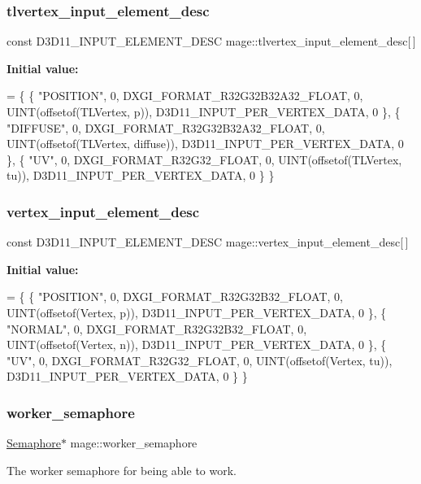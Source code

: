 \subsubsection{\texorpdfstring{tlvertex\+\_\+input\+\_\+element\+\_\+desc}{tlvertex\_input\_element\_desc}}
{\footnotesize\ttfamily const D3\+D11\+\_\+\+I\+N\+P\+U\+T\+\_\+\+E\+L\+E\+M\+E\+N\+T\+\_\+\+D\+E\+SC mage\+::tlvertex\+\_\+input\+\_\+element\+\_\+desc\mbox{[}$\,$\mbox{]}}

{\bfseries Initial value\+:}
\begin{DoxyCode}
= \{
        \{ \textcolor{stringliteral}{"POSITION"}, 0, DXGI\_FORMAT\_R32G32B32A32\_FLOAT, 0, UINT(offsetof(TLVertex, p)), 
      D3D11\_INPUT\_PER\_VERTEX\_DATA, 0 \},
        \{ \textcolor{stringliteral}{"DIFFUSE"}, 0, DXGI\_FORMAT\_R32G32B32A32\_FLOAT, 0, UINT(offsetof(TLVertex, diffuse)), 
      D3D11\_INPUT\_PER\_VERTEX\_DATA, 0 \},
        \{ \textcolor{stringliteral}{"UV"}, 0, DXGI\_FORMAT\_R32G32\_FLOAT, 0, UINT(offsetof(TLVertex, tu)), D3D11\_INPUT\_PER\_VERTEX\_DATA, 
      0 \}
    \}
\end{DoxyCode}
\hypertarget{namespacemage_a8647e0bbbbe87e5c6d7a4d4622230119}{}\label{namespacemage_a8647e0bbbbe87e5c6d7a4d4622230119} 
\subsubsection{\texorpdfstring{vertex\+\_\+input\+\_\+element\+\_\+desc}{vertex\_input\_element\_desc}}
{\footnotesize\ttfamily const D3\+D11\+\_\+\+I\+N\+P\+U\+T\+\_\+\+E\+L\+E\+M\+E\+N\+T\+\_\+\+D\+E\+SC mage\+::vertex\+\_\+input\+\_\+element\+\_\+desc\mbox{[}$\,$\mbox{]}}

{\bfseries Initial value\+:}
\begin{DoxyCode}
= \{
        \{ \textcolor{stringliteral}{"POSITION"}, 0, DXGI\_FORMAT\_R32G32B32\_FLOAT, 0, UINT(offsetof(Vertex, p)), 
      D3D11\_INPUT\_PER\_VERTEX\_DATA, 0 \},
        \{ \textcolor{stringliteral}{"NORMAL"}, 0, DXGI\_FORMAT\_R32G32B32\_FLOAT, 0, UINT(offsetof(Vertex, n)), 
      D3D11\_INPUT\_PER\_VERTEX\_DATA, 0 \},
        \{ \textcolor{stringliteral}{"UV"}, 0, DXGI\_FORMAT\_R32G32\_FLOAT, 0, UINT(offsetof(Vertex, tu)), D3D11\_INPUT\_PER\_VERTEX\_DATA, 0 
      \}
    \}
\end{DoxyCode}
\hypertarget{namespacemage_a17c3448f9fba7521d188d30bdfb77e33}{}\label{namespacemage_a17c3448f9fba7521d188d30bdfb77e33} 
\subsubsection{\texorpdfstring{worker\+\_\+semaphore}{worker\_semaphore}}
{\footnotesize\ttfamily \hyperlink{classmage_1_1_semaphore}{Semaphore}$\ast$ mage\+::worker\+\_\+semaphore\hspace{0.3cm}{\ttfamily [static]}}

The worker semaphore for being able to work. 